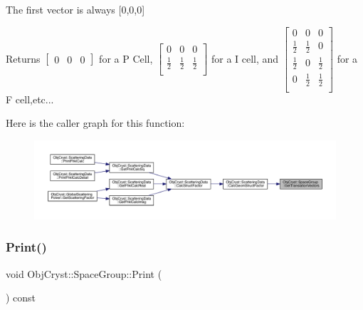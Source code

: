 The first vector is always \mbox{[}0,0,0\mbox{]} \begin{DoxyReturn}{Returns}
$ \left[ \begin {array}{ccc} 0 & 0 & 0 \end{array} \right] $ for a \textquotesingle{}P\textquotesingle{} Cell, $ \left[ \begin {array}{ccc} 0 & 0 & 0 \\ \frac{1}{2} & \frac{1}{2} & \frac{1}{2} \\ \end{array} \right] $ for a \textquotesingle{}I\textquotesingle{} cell, and $ \left[ \begin {array}{ccc} 0 & 0 & 0 \\ \frac{1}{2} & \frac{1}{2} & 0 \\ \frac{1}{2} & 0 & \frac{1}{2} \\ 0 & \frac{1}{2} & \frac{1}{2} \\ \end{array} \right] $ for a \textquotesingle{}F\textquotesingle{} cell,etc... 
\end{DoxyReturn}
Here is the caller graph for this function\+:
\nopagebreak
\begin{figure}[H]
\begin{center}
\leavevmode
\includegraphics[width=350pt]{class_obj_cryst_1_1_space_group_af0ee74eb5826d86a67e70a6113b7b34d_icgraph}
\end{center}
\end{figure}
\mbox{\label{class_obj_cryst_1_1_space_group_a3c71572bb11403564630db165a5ed1cc}} 
\subsubsection{\texorpdfstring{Print()}{Print()}}
{\footnotesize\ttfamily void Obj\+Cryst\+::\+Space\+Group\+::\+Print (\begin{DoxyParamCaption}{ }\end{DoxyParamCaption}) const}

